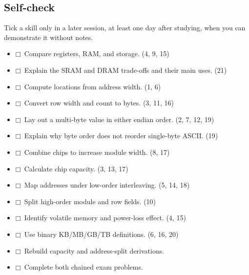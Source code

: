\documentclass[11pt]{article}
\begin{document}
\begin{keepsection}
\section{Self-check}

Tick a skill only in a later session, at least one day after studying, when you can demonstrate it without notes.

\begin{itemize}
\item $\mdlgwhtsquare$\ Compare registers, RAM, and storage. (4, 9, 15)
\item $\mdlgwhtsquare$\ Explain the SRAM and DRAM trade-offs and their main uses. (21)
\item $\mdlgwhtsquare$\ Compute locations from address width. (1, 6)
\item $\mdlgwhtsquare$\ Convert row width and count to bytes. (3, 11, 16)
\item $\mdlgwhtsquare$\ Lay out a multi-byte value in either endian order. (2, 7, 12, 19)
\item $\mdlgwhtsquare$\ Explain why byte order does not reorder single-byte ASCII. (19)
\item $\mdlgwhtsquare$\ Combine chips to increase module width. (8, 17)
\item $\mdlgwhtsquare$\ Calculate chip capacity. (3, 13, 17)
\item $\mdlgwhtsquare$\ Map addresses under low-order interleaving. (5, 14, 18)
\item $\mdlgwhtsquare$\ Split high-order module and row fields. (10)
\item $\mdlgwhtsquare$\ Identify volatile memory and power-loss effect. (4, 15)
\item $\mdlgwhtsquare$\ Use binary KB/MB/GB/TB definitions. (6, 16, 20)
\item $\mdlgwhtsquare$\ Rebuild capacity and address-split derivations.
\item $\mdlgwhtsquare$\ Complete both chained exam problems.
\end{itemize}
\end{keepsection}


\clearpage
\end{document}
